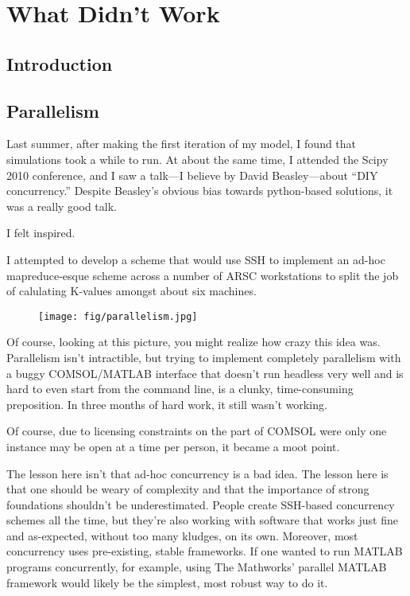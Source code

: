 \chapter{What Didn't Work}

\section{Introduction}

\section{Parallelism}

Last summer, after making the first iteration of my model, I found that
simulations took a while to run. At about the same time, I attended the
Scipy 2010 conference, and I saw a talk---I believe by David
Beasley---about ``DIY concurrency.'' Despite Beasley's obvious bias
towards python-based solutions, it was a really good talk.

I felt inspired.

I attempted to develop a scheme that would use SSH to implement an
ad-hoc mapreduce-esque scheme across a number of ARSC workstations to
split the job of calulating K-values amongst about six machines.

\begin{figure}[htbp]
\centering
\texttt{[image: fig/parallelism.jpg]}
\caption{}
\end{figure}

Of course, looking at this picture, you might realize how crazy this
idea was. Parallelism isn't intractible, but trying to implement
completely parallelism with a buggy COMSOL/MATLAB interface that doesn't
run headless very well and is hard to even start from the command line,
is a clunky, time-consuming preposition. In three months of hard work,
it still wasn't working.

Of course, due to licensing constraints on the part of COMSOL were only
one instance may be open at a time per person, it became a moot point.

The lesson here isn't that ad-hoc concurrency is a bad idea. The lesson
here is that one should be weary of complexity and that the importance
of strong foundations shouldn't be underestimated. People create
SSH-based concurrency schemes all the time, but they're also working
with software that works just fine and as-expected, without too many
kludges, on its own. Moreover, most concurrency uses pre-existing,
stable frameworks. If one wanted to run MATLAB programs concurrently,
for example, using The Mathworks' parallel MATLAB framework would likely
be the simplest, most robust way to do it.

